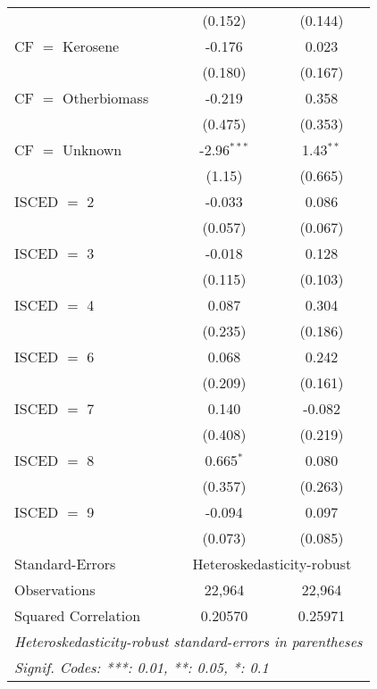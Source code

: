 \begin{table}[htbp!]
\begin{adjustbox}{width = 1\textwidth, max height = 0.95\textheight, center}
\begin{threeparttable}[b]
\begin{tabular}{lcc}
                                 & (0.152)        & (0.144)\\   
            CF $=$ Kerosene      & -0.176         & 0.023\\   
                                 & (0.180)        & (0.167)\\   
            CF $=$ Otherbiomass  & -0.219         & 0.358\\   
                                 & (0.475)        & (0.353)\\   
            CF $=$ Unknown       & -2.96$^{***}$  & 1.43$^{**}$\\   
                                 & (1.15)         & (0.665)\\   
            ISCED $=$ 2          & -0.033         & 0.086\\   
                                 & (0.057)        & (0.067)\\   
            ISCED $=$ 3          & -0.018         & 0.128\\   
                                 & (0.115)        & (0.103)\\   
            ISCED $=$ 4          & 0.087          & 0.304\\   
                                 & (0.235)        & (0.186)\\   
            ISCED $=$ 6          & 0.068          & 0.242\\   
                                 & (0.209)        & (0.161)\\   
            ISCED $=$ 7          & 0.140          & -0.082\\   
                                 & (0.408)        & (0.219)\\   
            ISCED $=$ 8          & 0.665$^{*}$    & 0.080\\   
                                 & (0.357)        & (0.263)\\   
            ISCED $=$ 9          & -0.094         & 0.097\\   
                                 & (0.073)        & (0.085)\\   
            \midrule 
            Standard-Errors & \multicolumn{2}{c}{Heteroskedasticity-robust} \\ 
            Observations         & 22,964         & 22,964\\  
            Squared Correlation  & 0.20570        & 0.25971\\  
            \midrule \midrule
            \multicolumn{3}{l}{\emph{Heteroskedasticity-robust standard-errors in parentheses}}\\
            \multicolumn{3}{l}{\emph{Signif. Codes: ***: 0.01, **: 0.05, *: 0.1}}\\
         \end{tabular}
         

\end{threeparttable}
\end{adjustbox}
\end{table}
